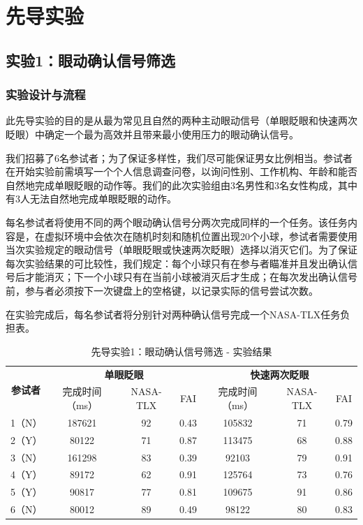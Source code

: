 \section{先导实验}

\subsection{实验1：眼动确认信号筛选}
\label{pilot-study-1}

\subsubsection{实验设计与流程}
此先导实验的目的是从最为常见且自然的两种主动眼动信号（单眼眨眼和快速两次眨眼）中确定一个最为高效并且带来最小使用压力的眼动确认信号。

我们招募了6名参试者；为了保证多样性，我们尽可能保证男女比例相当。参试者在开始实验前需填写一个个人信息调查问卷，以询问性别、工作机构、年龄和能否自然地完成单眼眨眼的动作等。我们的此次实验组由3名男性和3名女性构成，其中有3人无法自然地完成单眼眨眼的动作。

每名参试者将使用不同的两个眼动确认信号分两次完成同样的一个任务。该任务内容是，在虚拟环境中会依次在随机时刻和随机位置出现20个小球，参试者需要使用当次实验规定的眼动信号（单眼眨眼或快速两次眨眼）选择以消灭它们。为了保证每次实验结果的可比较性，我们规定：每个小球只有在参与者瞄准并且发出确认信号后才能消灭；下一个小球只有在当前小球被消灭后才生成；在每次发出确认信号前，参与者必须按下一次键盘上的空格键，以记录实际的信号尝试次数。

在实验完成后，每名参试者将分别针对两种确认信号完成一个NASA-TLX任务负担表。

\begin{table}[b!]
\centering
\caption{先导实验1：眼动确认信号筛选 - 实验结果}
\begin{tabular}{ccccccc}
\toprule
\multirow{2}{*}{\textbf{参试者}} & \multicolumn{3}{c}{\textbf{单眼眨眼}} & \multicolumn{3}{c}{\textbf{快速两次眨眼}} \\
  & 完成时间（ms） & NASA-TLX & FAI  & 完成时间（ms） & NASA-TLX & FAI  \\
\midrule
1（N） & 187621   & 92       & 0.43 & 105832   & 71       & 0.79 \\
2（Y） & 80122    & 71       & 0.87 & 113475   & 68       & 0.88 \\
3（N） & 161298   & 83       & 0.39 & 92103    & 79       & 0.91 \\
4（Y） & 89172    & 62       & 0.91 & 125764   & 73       & 0.76 \\
5（Y） & 90817    & 77       & 0.81 & 109675   & 91       & 0.86 \\
6（N） & 80012    & 89       & 0.49 & 98122    & 80       & 0.83 \\
\bottomrule
\end{tabular}
\label{table-4-1}
\end{table}

